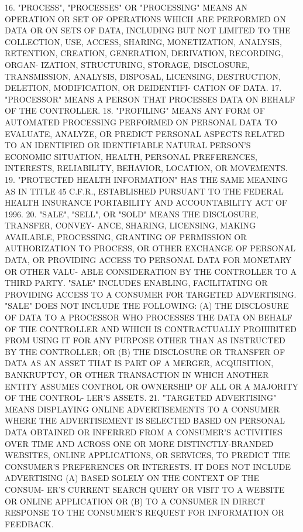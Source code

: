    16. "PROCESS", "PROCESSES" OR "PROCESSING" MEANS AN OPERATION  OR  SET
 OF  OPERATIONS WHICH ARE PERFORMED ON DATA OR ON SETS OF DATA, INCLUDING
 BUT NOT LIMITED TO THE COLLECTION, USE, ACCESS,  SHARING,  MONETIZATION,
 ANALYSIS, RETENTION, CREATION, GENERATION, DERIVATION, RECORDING, ORGAN-
 IZATION,   STRUCTURING,  STORAGE,  DISCLOSURE,  TRANSMISSION,  ANALYSIS,
 DISPOSAL, LICENSING, DESTRUCTION, DELETION, MODIFICATION, OR DEIDENTIFI-
 CATION OF DATA.
   17. "PROCESSOR" MEANS A PERSON THAT PROCESSES DATA ON  BEHALF  OF  THE
 CONTROLLER.
   18.  "PROFILING"  MEANS  ANY FORM OF AUTOMATED PROCESSING PERFORMED ON
 PERSONAL DATA TO EVALUATE, ANALYZE, OR PREDICT PERSONAL ASPECTS  RELATED
 TO  AN  IDENTIFIED  OR IDENTIFIABLE NATURAL PERSON'S ECONOMIC SITUATION,
 HEALTH,  PERSONAL   PREFERENCES,   INTERESTS,   RELIABILITY,   BEHAVIOR,
 LOCATION, OR MOVEMENTS.
   19. "PROTECTED HEALTH INFORMATION" HAS THE SAME MEANING AS IN TITLE 45
 C.F.R., ESTABLISHED PURSUANT TO THE FEDERAL HEALTH INSURANCE PORTABILITY
 AND ACCOUNTABILITY ACT OF 1996.
   20.  "SALE", "SELL", OR "SOLD" MEANS THE DISCLOSURE, TRANSFER, CONVEY-
 ANCE, SHARING, LICENSING,  MAKING  AVAILABLE,  PROCESSING,  GRANTING  OF
 PERMISSION  OR  AUTHORIZATION  TO PROCESS, OR OTHER EXCHANGE OF PERSONAL
 DATA, OR PROVIDING ACCESS TO PERSONAL DATA FOR MONETARY OR  OTHER  VALU-
 ABLE  CONSIDERATION BY THE CONTROLLER TO A THIRD PARTY.  "SALE" INCLUDES
 ENABLING, FACILITATING OR PROVIDING ACCESS TO A  CONSUMER  FOR  TARGETED
 ADVERTISING. "SALE" DOES NOT INCLUDE THE FOLLOWING:
   (A)  THE  DISCLOSURE  OF DATA TO A PROCESSOR WHO PROCESSES THE DATA ON
 BEHALF OF THE CONTROLLER AND  WHICH  IS  CONTRACTUALLY  PROHIBITED  FROM
 USING IT FOR ANY PURPOSE OTHER THAN AS INSTRUCTED BY THE CONTROLLER; OR
   (B)  THE  DISCLOSURE OR TRANSFER OF DATA AS AN ASSET THAT IS PART OF A
 MERGER, ACQUISITION, BANKRUPTCY, OR OTHER TRANSACTION IN  WHICH  ANOTHER
 ENTITY ASSUMES CONTROL OR OWNERSHIP OF ALL OR A MAJORITY OF THE CONTROL-
 LER'S ASSETS.
   21. "TARGETED ADVERTISING" MEANS DISPLAYING ONLINE ADVERTISEMENTS TO A
 CONSUMER  WHERE  THE  ADVERTISEMENT  IS  SELECTED BASED ON PERSONAL DATA
 OBTAINED OR INFERRED FROM A CONSUMER'S ACTIVITIES OVER TIME  AND  ACROSS
 ONE   OR  MORE  DISTINCTLY-BRANDED  WEBSITES,  ONLINE  APPLICATIONS,  OR
 SERVICES, TO PREDICT THE CONSUMER'S PREFERENCES OR INTERESTS.   IT  DOES
 NOT  INCLUDE  ADVERTISING (A) BASED SOLELY ON THE CONTEXT OF THE CONSUM-
 ER'S CURRENT SEARCH QUERY OR VISIT TO A WEBSITE OR ONLINE APPLICATION OR
 (B) TO A CONSUMER IN DIRECT  RESPONSE  TO  THE  CONSUMER'S  REQUEST  FOR
 INFORMATION OR FEEDBACK.
